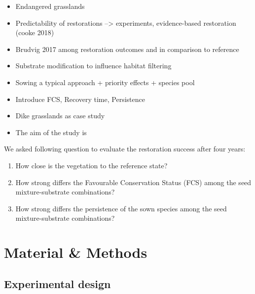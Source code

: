\documentclass[
]{article}
\begin{document}
\begin{itemize}
\item
  Endangered grasslands
\item
  Predictability of restorations --\textgreater{} experiments, evidence-based restoration (cooke 2018)
\item
  Brudvig 2017 among restoration outcomes and in comparison to reference
\item
  Substrate modification to influence habitat filtering
\item
  Sowing a typical approach + priority effects + species pool
\item
  Introduce FCS, Recovery time, Persistence
\item
  Dike grasslands as case study
\item
  The aim of the study is
\end{itemize}

We asked following question to evaluate the restoration success after four years:

\begin{enumerate}
\def\labelenumi{\arabic{enumi}.}
\item
  How close is the vegetation to the reference state?
\item
  How strong differs the Favourable Conservation Status (FCS) among the seed mixture-substrate combinations?
\item
  How strong differs the persistence of the sown species among the seed mixture-substrate combinations?
\end{enumerate}

\clearpage

\newpage

\hypertarget{material-methods}{%
\section{Material \& Methods}\label{material-methods}}

\hypertarget{experimental-design}{%
\subsection*{Experimental design}\label{experimental-design}}
\end{document}

